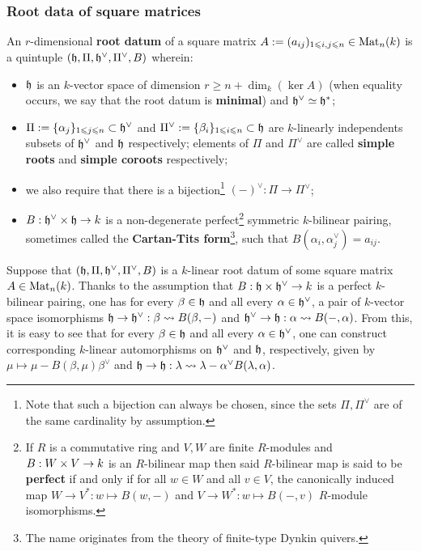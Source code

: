         \subsubsection{Root data of square matrices}
            \begin{definition} \label{def: root_data_of_square_matrices}
                An $r$-dimensional \textbf{root datum} of a square matrix $A := (a_{ij})_{1 \leqslant i, j \leqslant n} \in \mathrm{Mat}_n(k)$ is a quintuple $(\mathfrak{h}, \Pi, \mathfrak{h}^{\vee}, \Pi^{\vee}, B)$ wherein:
                    \begin{itemize}
                        \item $\mathfrak{h}$ is an $k$-vector space of dimension $r \geq n + \dim_k(\ker A)$ (when equality occurs, we say that the root datum is \textbf{minimal}) and $\mathfrak{h}^{\vee} \simeq \mathfrak{h}^*$;
                        \item $\Pi := \{\alpha_j\}_{1 \leqslant j \leqslant n} \subset \mathfrak{h}^{\vee}$ and $\Pi^{\vee} := \{\beta_i\}_{1 \leqslant i \leqslant n} \subset \mathfrak{h}$ are $k$-linearly independents subsets of $\mathfrak{h}^{\vee}$ and $\mathfrak{h}$ respectively; elements of $\Pi$ and $\Pi^{\vee}$ are called \textbf{simple roots} and \textbf{simple coroots} respectively;
                        \item we also require that there is a bijection\footnote{Note that such a bijection can always be chosen, since the sets $\Pi, \Pi^{\vee}$ are of the same cardinality by assumption.} $(-)^{\vee}: \Pi \to \Pi^{\vee}$;
                        \item $B: \h^{\vee} \x \h \to k$ is a non-degenerate perfect\footnote{If $R$ is a commutative ring and $V, W$ are finite $R$-modules and $B: W \x V \to k$ is an $R$-bilinear map then said $R$-bilinear map is said to be \textbf{perfect} if and only if for all $w \in W$ and all $v \in V$, the canonically induced map $W \to V^*: w \mapsto B(w, -)$ and $V \to W^*: w \mapsto B(-, v)$ $R$-module isomorphisms.} symmetric $k$-bilinear pairing, sometimes called the \textbf{Cartan-Tits form}\footnote{The name originates from the theory of finite-type Dynkin quivers.}, such that $B(\alpha_i, \alpha_j^{\vee}) = a_{ij}$.
                    \end{itemize}
            \end{definition}
            \begin{remark} \label{remark: dualising_(co)roots_and_induced_simple_reflections}
                Suppose that $(\mathfrak{h}, \Pi, \mathfrak{h}^{\vee}, \Pi^{\vee}, B)$ is a $k$-linear root datum of some square matrix $A \in \mathrm{Mat}_n(k)$. Thanks to the assumption that $B: \h \x \h^{\vee} \to k$ is a perfect $k$-bilinear pairing, one has for every $\beta \in \mathfrak{h}$ and all every $\alpha \in \mathfrak{h}^{\vee}$, a pair of $k$-vector space isomorphisms $\mathfrak{h} \to \mathfrak{h}^{\vee}: \beta \leadsto B(\beta, -)$ and $\mathfrak{h}^{\vee} \to \mathfrak{h}: \alpha \leadsto B(-, \alpha)$. From this, it is easy to see that for every $\beta \in \mathfrak{h}$ and all every $\alpha \in \mathfrak{h}^{\vee}$, one can construct corresponding $k$-linear automorphisms on $\mathfrak{h}^{\vee}$ and $\mathfrak{h}$, respectively, given by $\mu \mapsto \mu - B(\beta, \mu) \beta^{\vee}$ and $\mathfrak{h} \to \mathfrak{h}: \lambda \leadsto \lambda - \alpha^{\vee} B(\lambda, \alpha)$.
            \end{remark}
